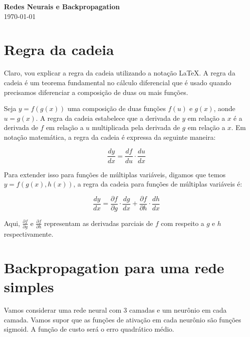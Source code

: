 \documentclass[12pt,a4paper, brazil]{article}
\begin{document}
\begin{center}
{\textbf {\huge Redes Neurais e Backpropagation}}\\[5mm]
\today\\[5mm] %
\end{center}



\section{Regra da cadeia}
Claro, vou explicar a regra da cadeia utilizando a notação LaTeX. A regra da cadeia é um teorema fundamental no cálculo diferencial que é usado quando precisamos diferenciar a composição de duas ou mais funções. 

Seja $y = f(g(x))$ uma composição de duas funções $f(u)$ e $g(x)$, aonde $u = g(x)$. A regra da cadeia estabelece que a derivada de $y$ em relação a $x$ é a derivada de $f$ em relação a $u$ multiplicada pela derivada de $g$ em relação a $x$. Em notação matemática, a regra da cadeia é expressa da seguinte maneira:

$$\frac{dy}{dx} = \frac{df}{du} \cdot \frac{du}{dx}$$

Para extender isso para funções de múltiplas variáveis, digamos que temos $y = f(g(x), h(x))$, a regra da cadeia para funções de múltiplas variáveis é:

$$\frac{dy}{dx} = \frac{\partial f}{\partial g} \cdot \frac{dg}{dx} + \frac{\partial f}{\partial h} \cdot \frac{dh}{dx}$$

Aqui, $\frac{\partial f}{\partial g}$ e $\frac{\partial f}{\partial h}$ representam as derivadas parciais de $f$ com respeito a $g$ e $h$ respectivamente.

\section{Backpropagation para uma rede simples}

Vamos considerar uma rede neural com 3 camadas e um neurônio em cada camada. Vamos supor que as funções de ativação em cada neurônio são funções sigmoid. A função de custo será o erro quadrático médio. 
\end{document}
